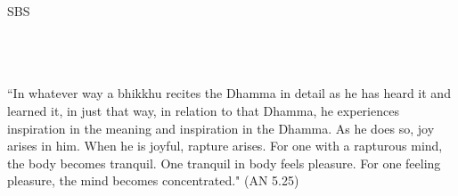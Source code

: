 \cleartorecto
\thispagestyle{empty}
\vspace*{3em}

{\centering

  \settowidth{\titleLength}{%
    {\Large\chapterTitleFont\textsc{\MakeUppercase{{\thetitle}}}}%
  }

  {\Huge\fontsize{64}{16}\sbsFont SBS}\\[1.0\baselineskip]%

  {\Huge\chapterTitleFont\textsc{{\thetitle\linebreak}}}\\[0.2\baselineskip]

  \\[1.4\baselineskip]

  {\Large\scshape \thesubtitle}\\[2.5\baselineskip]


  {\quote “\Huge{I}n whatever way a bhikkhu recites the Dhamma in detail as he has heard it and learned it, in just that way, in relation to that Dhamma, he experiences inspiration in the meaning and inspiration in the Dhamma. As he does so, joy arises in him. When he is joyful, rapture arises. For one with a rapturous mind, the body becomes tranquil. One tranquil in body feels pleasure. For one feeling pleasure, the mind becomes concentrated." (AN 5.25)}\\[1.4\baselineskip]
}

